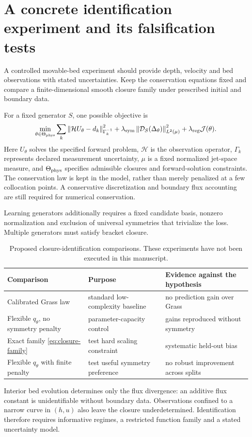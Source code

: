 \documentclass[11pt,a4paper,oneside]{report}
\numberwithin{equation}{chapter}
\newcommand{\norm}[1]{\left\lVert#1\right\rVert}
\begin{document}
\section{A concrete identification experiment and its falsification tests}
A controlled movable-bed experiment should provide depth, velocity and bed observations with stated uncertainties. Keep the conservation equations fixed and compare a finite-dimensional smooth closure family under prescribed initial and boundary data.

For a fixed generator $S$, one possible objective is
\begin{equation}\label{eq:objective}
\min_{\theta\in\Theta_{\rm phys}}
\sum_{k}\norm{\mathcal H U_\theta-d_k}_{\Gamma_k^{-1}}^2
+\lambda_{\rm sym}\norm{\mathcal D_S(\Delta_\theta)}_{L^2(\mu)}^2
+\lambda_{\rm reg}\mathcal J(\theta).
\end{equation}
Here $U_\theta$ solves the specified forward problem, $\mathcal H$ is the observation operator, $\Gamma_k$ represents declared measurement uncertainty, $\mu$ is a fixed normalized jet-space measure, and $\Theta_{\rm phys}$ specifies admissible closures and forward-solution constraints. The conservation law is kept in the model, rather than merely penalized at a few collocation points. A conservative discretization and boundary flux accounting are still required for numerical conservation.

Learning generators additionally requires a fixed candidate basis, nonzero normalization and exclusion of universal symmetries that trivialize the loss. Multiple generators must satisfy bracket closure.

\begin{table}[!htbp]\centering\small
\begin{tabularx}{\textwidth}{@{}>{\raggedright\arraybackslash}p{}XX@{}}\toprule
Comparison & Purpose & Evidence against the hypothesis\\\midrule
Calibrated Grass law & standard low-complexity baseline & no prediction gain over Grass\\
Flexible $q_\theta$, no symmetry penalty & parameter-capacity control & gains reproduced without symmetry\\
Exact family \eqref{eq:closure-family} & test hard scaling constraint & systematic held-out bias\\
Flexible $q_\theta$ with finite penalty & test useful symmetry preference & no robust improvement across splits\\\bottomrule
\end{tabularx}
\caption{Proposed closure-identification comparisons. These experiments have not been executed in this manuscript.}\label{tab:identification}
\end{table}
Interior bed evolution determines only the flux divergence: an additive flux constant is unidentifiable without boundary data. Observations confined to a narrow curve in $(h,u)$ also leave the closure underdetermined. Identification therefore requires informative regimes, a restricted function family and a stated uncertainty model.
\end{document}
